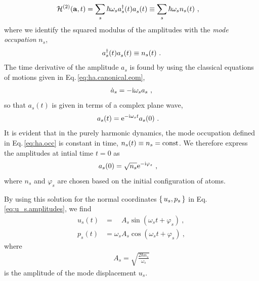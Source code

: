 \begin{align}
	\mathcal{H}^{(2)} (\b a, t)
		&= \sum_s \hbar \omega_s \D a_s (t) \fD a_s (t)
	\equiv \sum_s \hbar \omega_s n_s (t)~,
	\label{eq:Hamiltonian.aa}
\end{align}
where we identify the squared modulus of the amplitudes with the \emph{mode occupation} $n_s$,
\begin{align}
	\D a_s (t) \fD a_s (t) \equiv n_s (t)~.
	\label{eq:ha.occ}
\end{align}
The time derivative of the amplitude $a_s$ is found by using the classical equations of motions given in Eq.\,\eqref{eq:ha.canonical.eom},
\begin{align}
	\dot a_s
		= - \im \omega_s a_s~,
	\label{eq:dot_a_s}
\end{align}
so that $a_s (t)$ is given in terms of a complex plane wave,
	\begin{align}
		a_s (t) 
			& = {\rm e}^{- \im \omega_s t} a_s (0)~.
			\label{eq:a_s(t)}
	\end{align}
It is evident that in the purely harmonic dynamics, the mode occupation defined in Eq.\,\eqref{eq:ha.occ} is constant in time, $n_s (t) \equiv n_s = {\rm const}$. We therefore express the amplitudes at intial time $t=0$ as
\begin{align}
	a_s (0)
		& = \sqrt{n_s} {\rm e}^{- {\rm i} \varphi_s}~,
\end{align}
where $n_s$ and $\varphi_s$ are chosen based on the initial configuration of atoms.


By using this solution for the normal coordinates $\set{u_s, p_s}$ in Eq.\,\eqref{eq:u_s.amplitudes}, we find
\begin{subequations}
	\label{eq:u_p_st}
	\begin{align}
	u_s (t) 
	&= \phantom{\omega_s} A_s \sin (\omega_s t + \varphi_s)~,
	\label{eq:u_s(t)}
	\\
	p_s (t) 
	&= \omega_s A_s \cos (\omega_s t + \varphi_s)~,
	\end{align}
\end{subequations}
where 
\begin{align}
	A_s = \sqrt{\frac{2 \hbar n_s}{\omega_s}}
\end{align}
is the amplitude of the mode displacement $u_s$.

